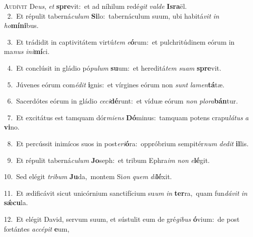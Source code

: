 \lettrine{\initial\textcolor{\initialcolor}{A}}{udívit} De\-\textit{us}\-, \textit{et} \textbf{spre}\-vit:~\star et ad níhilum redé\textit{git} \textit{val}\-\textit{de} \textbf{Is}\-\textbf{ra}ël.\\
{\numbfont\textcolor{\numbcolor}{~2.}}~Et répulit taberná\-\textit{cu}\-\textit{lum} \textbf{Si}\-lo:~\star tabernáculum suum, ubi habitá\textit{vit} \textit{in} \textit{ho}\-\textbf{mí}\textbf{ni}bus.\par
{\numbfont\textcolor{\numbcolor}{~3.}}~Et trádidit in captivitátem virtú\textit{tem} \textit{e}\-\textbf{ó}rum:~\star et pulchritúdinem eórum in ma\textit{nus} \textit{in}\-\textit{i}\textbf{mí}ci.\par
{\numbfont\textcolor{\numbcolor}{~4.}}~Et conclúsit in gládio pó\-\textit{pu}\-\textit{lum} \textbf{su}\-um:~\star et hereditá\textit{tem} \textit{su}\-\textit{am} \textbf{spre}\-vit.\par
{\numbfont\textcolor{\numbcolor}{~5.}}~Júvenes eórum com\-\textit{é}\-\textit{dit} \textbf{i}\-gnis:~\star et vírgines eórum non \textit{sunt} \textit{la}\-\textit{men}\textbf{tá}tæ.\par
{\numbfont\textcolor{\numbcolor}{~6.}}~Sacerdótes eórum in gládio \textit{ce}\-\textit{ci}\textbf{dé}runt:~\star et víduæ eórum \textit{non} \textit{plo}\-\textit{ra}\textbf{bán}tur.\par
{\numbfont\textcolor{\numbcolor}{~7.}}~Et excitátus est tamquam dór\-\textit{mi}\-\textit{ens} \textbf{Dó}\-minus:~\star tamquam potens crapu\-\textit{lá}\-\textit{tus} \textit{a} \textbf{vi}\-no.\par
{\numbfont\textcolor{\numbcolor}{~8.}}~Et percússit inimícos suos in post\-\textit{e}\-\textit{ri}\textbf{ó}ra:~\star oppróbrium sempitér\textit{num} \textit{de}\-\textit{dit} \textbf{il}\-lis.\par
{\numbfont\textcolor{\numbcolor}{~9.}}~Et répulit taberná\-\textit{cu}\-\textit{lum} \textbf{Jo}\-seph:~\star et tribum Ephra\textit{im} \textit{non} \textit{e}\-\textbf{lé}git.\par
{\numbfont\textcolor{\numbcolor}{10.}}~Sed elégit \textit{tri}\-\textit{bum} \textbf{Ju}\-da,~\star montem Si\textit{on} \textit{quem} \textit{di}\-\textbf{lé}xit.\par
{\numbfont\textcolor{\numbcolor}{11.}}~Et ædificávit sicut unicórnium sanctifícium su\textit{um} \textit{in} \textbf{ter}\-ra,~\star quam fun\-\textit{dá}\-\textit{vit} \textit{in} \textbf{sǽ}\-\textbf{cu}la.\par
{\numbfont\textcolor{\numbcolor}{12.}}~Et elégit David, servum suum, et sústulit eum de gré\-\textit{gi}\-\textit{bus} \textbf{ó}\-vium:~\star de post fœtántes \textit{ac}\-\textit{cé}\textit{pit} \textbf{e}\-um,\par
